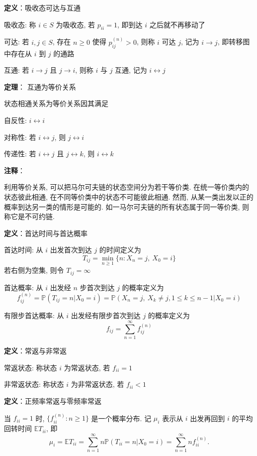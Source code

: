 \documentclass[openany]{ctexbook}
\theoremstyle{kaiti}
\theoremstyle{normal}
\begin{document}
\textbf{定义}：吸收态可达与互通

吸收态: 称 $i\in S$ 为吸收态, 若 $p_{ii}=1$, 即到达 $i$ 之后就不再移动了

可达: 若 $i,j\in S$, 存在 $n\geqslant0$ 使得 $p_{ij}^{(n)}>0$, 则称 $i$ 可达 $j$, 记为 $i\rightarrow j$, 即转移图中存在从 $i$ 到 $j$ 的通路

互通: 若 $i\rightarrow j$ 且 $j\rightarrow i$, 则称 $i$ 与 $j$ 互通, 记为 $i\leftrightarrow j$

\textbf{定理}： 互通为等价关系

状态相通关系为等价关系因其满足

自反性: $i\leftrightarrow i$

对称性: 若 $i\leftrightarrow j$, 则 $j\leftrightarrow i$

传递性: 若 $i\leftrightarrow j$ 且 $j\leftrightarrow k$, 则 $i\leftrightarrow k$

\textbf{注释}：

利用等价关系, 可以把马尔可夫链的状态空间分为若干等价类. 在统一等价类内的状态彼此相通, 在不同等价类中的状态不可能彼此相通. 然而, 从某一类出发以正的概率到达另一类的情形是可能的. 如一马尔可夫链的所有状态属于同一等价类, 则称它是不可约链.

\textbf{定义}：首达时间与首达概率

首达时间: 从 $i$ 出发首次到达 $j$ 的时间定义为
\begin{equation}
  T_{ij}=\min_{n\geqslant1}\{n:X_n=j,~X_0=i\}
\end{equation}
若右侧为空集, 则令 $T_{ij}=\infty$

首达概率: 从 $i$ 出发经 $n$ 步首次到达 $j$ 的概率定义为 
\begin{equation}
  f_{ij}^{(n)}=\mathbb{P}(T_{ij}=n|X_0=i)=\mathbb{P}(X_n=j,~X_k\neq j,1\leqslant k\leqslant n-1|X_0=i)
\end{equation}

有限步首达概率: 从 $i$ 出发经有限步首次到达 $j$ 的概率定义为
\begin{equation}
  f_{ij}=\sum_{n=1}^\infty f_{ij}^{(n)}
\end{equation}

\textbf{定义}：常返与非常返

常返状态: 称状态 $i$ 为常返状态, 若 $f_{ii}=1$

非常返状态: 称状态 $i$ 为非常返状态, 若 $f_{ii}<1$

\textbf{定义}：正频率常返与零频率常返

当 $f_{ii}=1$ 时, $\Big\{f_{ii}^{(n)}:n\geqslant1\Big\}$ 是一个概率分布. 记 $\mu_i$ 表示从 $i$ 出发再回到 $i$ 的平均回转时间 $\mathbb{E}T_{ii}$, 即
\begin{equation}
  \mu_i=\mathbb{E}T_{ii}=\sum_{n=1}^\infty n \mathbb{P}(T_{ii}=n|X_0=i)=\sum_{n=1}^\infty nf_{ii}^{(n)}.
\end{equation}
\end{document}
